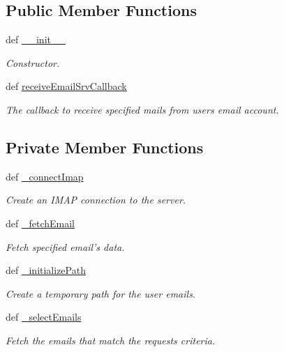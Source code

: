 \subsection*{Public Member Functions}
\begin{DoxyCompactItemize}
\item 
def \hyperlink{classrapp__email_1_1email__receiver_1_1EmailReceiver_ae5d530bae993a7611ba1b6a8a15131a1}{\-\_\-\-\_\-init\-\_\-\-\_\-}
\begin{DoxyCompactList}\small\item\em Constructor. \end{DoxyCompactList}\item 
def \hyperlink{classrapp__email_1_1email__receiver_1_1EmailReceiver_a4c2e435099bf0edb69c28cbeba69e784}{receive\-Email\-Srv\-Callback}
\begin{DoxyCompactList}\small\item\em The callback to receive specified mails from users email account. \end{DoxyCompactList}\end{DoxyCompactItemize}
\subsection*{Private Member Functions}
\begin{DoxyCompactItemize}
\item 
def \hyperlink{classrapp__email_1_1email__receiver_1_1EmailReceiver_ab08deb87673ae56dcc547ba48a13cb00}{\-\_\-connect\-Imap}
\begin{DoxyCompactList}\small\item\em Create an I\-M\-A\-P connection to the server. \end{DoxyCompactList}\item 
def \hyperlink{classrapp__email_1_1email__receiver_1_1EmailReceiver_ae756430db410c703e8ec0ff14e677b20}{\-\_\-fetch\-Email}
\begin{DoxyCompactList}\small\item\em Fetch specified email's data. \end{DoxyCompactList}\item 
def \hyperlink{classrapp__email_1_1email__receiver_1_1EmailReceiver_a0fa7fad7e580d4a6f7c61fcc97061f72}{\-\_\-initialize\-Path}
\begin{DoxyCompactList}\small\item\em Create a temporary path for the user emails. \end{DoxyCompactList}\item 
def \hyperlink{classrapp__email_1_1email__receiver_1_1EmailReceiver_aba920384377d2e884237ba9022c37e76}{\-\_\-select\-Emails}
\begin{DoxyCompactList}\small\item\em Fetch the emails that match the requests criteria. \end{DoxyCompactList}\end{DoxyCompactItemize}


